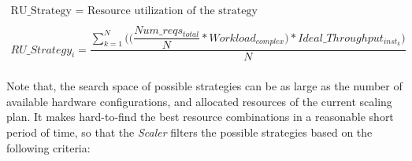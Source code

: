 
{\scriptsize
\begin{equation}\label{resource_combination}
\begin{split}
\text{RU\_Strategy = Resource utilization of the strategy} \\ \\
RU\_Strategy_{i} = \dfrac{ \sum_{k=1}^N \bigg( \bigg( \dfrac{ Num\_reqs_{total} } {N}  * Workload_{complex} \bigg) * Ideal\_Throughput_{inst_{k}} \bigg) }  {N} \\ 
\end{split}
\end{equation}
}




Note that, the search space of possible strategies can be as large as the number of available hardware configurations, and allocated resources of the current scaling plan. It makes hard-to-find the best resource combinations in a reasonable short period of time, so that the \emph{Scaler} filters the possible strategies based on the following criteria:

